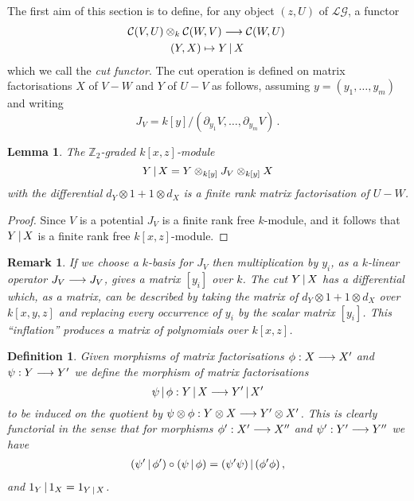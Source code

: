 \documentclass[english,letter paper,12pt,leqno]{article}
\newtheorem{lemma}[theorem]{Lemma}
\theoremstyle{example}
\newtheorem{definition}[theorem]{Definition}
\newtheorem{remark}[theorem]{Remark}
\numberwithin{equation}{section}
\def\LG{\mathcal{LG}}
\def\be{\begin{equation}}
\def\ee{\end{equation}}
\def\nZ{\mathds{Z}}
\def\L{\mathcal{C}}
\begin{document}
 The first aim of this section is to define, for any object $(z,U)$ of $\LG$, a functor
\begin{gather*}
\L(V,U) \otimes_k \L(W,V) \lto \L(W, U)\,\\
(Y,X) \mapsto Y \l X
\end{gather*}
which we call the \textsl{cut functor}. The cut operation is defined on matrix factorisations $X$ of $V - W$ and $Y$ of $U - V$ as follows, assuming $y = (y_1,\ldots,y_m)$ and writing
\be\label{eq:defnjacobian}
J_V = k[y] / ( \partial_{y_1} V, \ldots, \partial_{y_m} V )\,.
\ee

\begin{lemma} The $\nZ_2$-graded $k[x,z]$-module
\[
Y \,|\, X = Y \otimes_{k[y]} J_V \otimes_{k[y]} X
\]
with the differential $d_Y \otimes 1 + 1 \otimes d_X$ is a finite rank matrix factorisation of $U - W$.
\end{lemma}
\begin{proof}
Since $V$ is a potential $J_V$ is a finite rank free $k$-module, and it follows that $Y \,|\, X$ is a finite rank free $k[x,z]$-module. 


\end{proof}

\begin{remark}\label{remark:inflation} If we choose a $k$-basis for $J_V$ then multiplication by $y_i$, as a $k$-linear operator $J_V \longrightarrow J_V$, gives a matrix $[y_i]$ over $k$. The cut $Y \,|\, X$ has a differential which, as a matrix, can be described by taking the matrix of $d_Y \otimes 1 + 1 \otimes d_X$ over $k[x,y,z]$ and replacing every occurrence of $y_i$ by the scalar matrix $[y_i]$. This ``inflation'' produces a matrix of polynomials over $k[x,z]$. 
\end{remark}

\begin{definition} Given morphisms of matrix factorisations $\phi: X \longrightarrow X'$ and $\psi: Y \longrightarrow Y'$ we define the morphism of matrix factorisations
\[
\psi \,|\, \phi: Y \,|\, X \longrightarrow Y' \,|\, X'
\]
to be induced on the quotient by $\psi \otimes \phi: Y \otimes X \longrightarrow Y' \otimes X'$. This is clearly functorial in the sense that for morphisms $\phi': X' \longrightarrow X''$ and $\psi': Y' \longrightarrow Y''$ we have
\begin{align}
( \psi' \,|\, \phi' ) \circ ( \psi \,|\, \phi ) = ( \psi' \psi ) \,|\, ( \phi' \phi )\,,
\end{align}
and $1_Y \,|\, 1_X = 1_{Y \,|\, X}$.
\end{definition}
\end{document}
